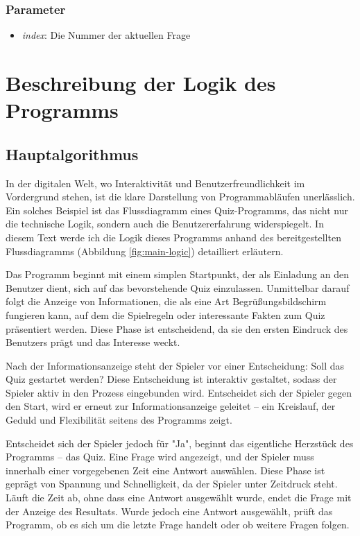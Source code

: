 \documentclass[10pt, fleqn]{scrartcl}
\begin{document}
\subsubsection*{Parameter}
\begin{itemize}
	\item \textit{index}: Die Nummer der aktuellen Frage
\end{itemize}


\newpage

\section{Beschreibung der Logik des Programms}

\subsection{Hauptalgorithmus}

In der digitalen Welt, wo Interaktivität und Benutzerfreundlichkeit im Vordergrund stehen, ist die klare Darstellung von Programmabläufen unerlässlich. Ein solches Beispiel ist das Flussdiagramm eines Quiz-Programms, das nicht nur die technische Logik, sondern auch die Benutzererfahrung widerspiegelt. In diesem Text werde ich die Logik dieses Programms anhand des bereitgestellten Flussdiagramms (Abbildung \ref{fig:main-logic}) detailliert erläutern.

Das Programm beginnt mit einem simplen Startpunkt, der als Einladung an den Benutzer dient, sich auf das bevorstehende Quiz einzulassen. Unmittelbar darauf folgt die Anzeige von Informationen, die als eine Art Begrüßungsbildschirm fungieren kann, auf dem die Spielregeln oder interessante Fakten zum Quiz präsentiert werden. Diese Phase ist entscheidend, da sie den ersten Eindruck des Benutzers prägt und das Interesse weckt.

Nach der Informationsanzeige steht der Spieler vor einer Entscheidung: Soll das Quiz gestartet werden? Diese Entscheidung ist interaktiv gestaltet, sodass der Spieler aktiv in den Prozess eingebunden wird. Entscheidet sich der Spieler gegen den Start, wird er erneut zur Informationsanzeige geleitet – ein Kreislauf, der Geduld und Flexibilität seitens des Programms zeigt.

Entscheidet sich der Spieler jedoch für "Ja", beginnt das eigentliche Herzstück des Programms – das Quiz. Eine Frage wird angezeigt, und der Spieler muss innerhalb einer vorgegebenen Zeit eine Antwort auswählen. Diese Phase ist geprägt von Spannung und Schnelligkeit, da der Spieler unter Zeitdruck steht. Läuft die Zeit ab, ohne dass eine Antwort ausgewählt wurde, endet die Frage mit der Anzeige des Resultats. Wurde jedoch eine Antwort ausgewählt, prüft das Programm, ob es sich um die letzte Frage handelt oder ob weitere Fragen folgen.
\end{document}
